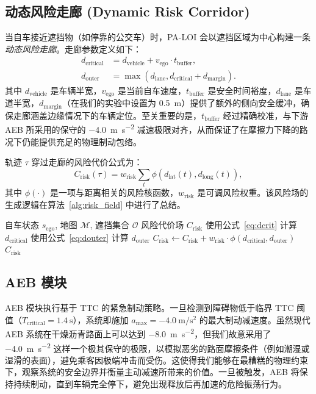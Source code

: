 \documentclass[conference]{IEEEtran}
\begin{document}
\subsection{动态风险走廊 (Dynamic Risk Corridor)}
当自车接近遮挡物（如停靠的公交车）时，PA-LOI 会以遮挡区域为中心构建一条\emph{动态风险走廊}。走廊参数定义如下：
\begin{align}
    d_{\text{critical}} &= d_{\text{vehicle}} + v_{\text{ego}} \cdot t_{\text{buffer}}, \label{eq:dcrit} \\
    d_{\text{outer}} &= \max(d_{\text{lane}}, d_{\text{critical}} + d_{\text{margin}}). \label{eq:douter}
\end{align}
其中 $d_{\text{vehicle}}$ 是车辆半宽，$v_{\text{ego}}$ 是当前自车速度，$t_{\text{buffer}}$ 是安全时间裕度，$d_{\text{lane}}$ 是车道半宽，$d_{\text{margin}}$（在我们的实验中设置为 \SI{0.5}{\meter}）提供了额外的侧向安全缓冲，确保走廊涵盖边缘情况下的车辆定位。至关重要的是，$t_{\text{buffer}}$ 经过精确校准，与下游 AEB 所采用的保守的 \SI{-4.0}{\meter\per\second\squared} 减速极限对齐，从而保证了在摩擦力下降的路况下仍能提供充足的物理制动包络。

轨迹 $\tau$ 穿过走廊的风险代价公式为：
\begin{equation}
    C_{\text{risk}}(\tau) = w_{\text{risk}} \sum_{t} \phi(d_{\text{lat}}(t), d_{\text{long}}(t)),
    \label{eq:risk_cost}
\end{equation}
其中 $\phi(\cdot)$ 是一项与距离相关的风险核函数，$w_{\text{risk}}$ 是可调风险权重。该风险场的生成逻辑在算法~\ref{alg:risk_field} 中进行了总结。

\begin{algorithm}[htbp]
\caption{动态风险场生成 (Dynamic Risk Field Generation)}
\label{alg:risk_field}
\begin{algorithmic}[1]
\REQUIRE 自车状态 $s_{\text{ego}}$, 地图 $\mathcal{M}$, 遮挡集合 $\mathcal{O}$
\ENSURE 风险代价场 $C_{\text{risk}}$
        \STATE 使用公式~\eqref{eq:dcrit} 计算 $d_{\text{critical}}$
        \STATE 使用公式~\eqref{eq:douter} 计算 $d_{\text{outer}}$
        \STATE $C_{\text{risk}} \gets C_{\text{risk}} + w_{\text{risk}} \cdot \phi(d_{\text{critical}}, d_{\text{outer}})$
    \ENDIF
\ENDFOR
\RETURN $C_{\text{risk}}$
\end{algorithmic}
\end{algorithm}

\subsection{AEB 模块}
AEB 模块执行基于 TTC 的紧急制动策略。一旦检测到障碍物低于临界 TTC 阈值（$T_{\text{critical}} = \SI{1.4}{\second}$），系统即施加 $a_{\text{max}} = \SI{-4.0}{\meter\per\second\squared}$ 的最大制动减速度。虽然现代 AEB 系统在干燥沥青路面上可以达到 \SI{-8.0}{\meter\per\second\squared}，但我们故意采用了 \SI{-4.0}{\meter\per\second\squared} 这样一个极其保守的极限，以模拟恶劣的路面摩擦条件（例如潮湿或湿滑的表面），避免乘客因极端冲击而受伤。这使得我们能够在最糟糕的物理约束下，观察系统的安全边界并衡量主动减速所带来的价值。一旦被触发，AEB 将保持持续制动，直到车辆完全停下，避免出现释放后再加速的危险振荡行为。
\end{document}
